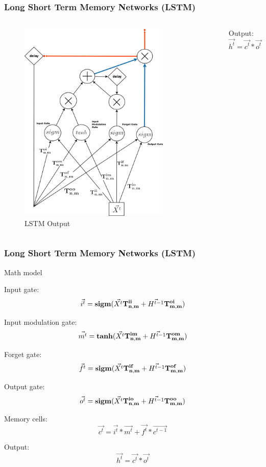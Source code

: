 \documentclass{beamer}
\begin{document}
\begin{frame}
\frametitle{Long Short Term Memory Networks (LSTM)}
\begin{columns}
\begin{figure}[t!]
    \centering
    \includegraphics[width=0.8\textwidth]{./pictures/figures/LSTM_output.png}
    \caption{LSTM Output}
    \label{fig:LSTM_output}
\end{figure}

Output:
$$\vec{h^t} = \vec{c^t} * \vec{o^t}$$
\end{columns}
\end{frame}

\begin{frame}
\frametitle{Long Short Term Memory Networks (LSTM)}
Math model \cite{zaremba2014recurrent}

Input gate:
$$\vec{i^t} = \bold{sigm}(\vec{X^t}\bold{T_{n,m}^{ii}} + \vec{H^{t-1}}\bold{T_{m,m}^{oi}})$$

Input modulation gate:
$$\vec{m^t} = \bold{tanh}(\vec{X^t}\bold{T_{n,m}^{im}} + \vec{H^{t-1}}\bold{T_{m,m}^{om}})$$

Forget gate:
$$\vec{f^t} = \bold{sigm}(\vec{X^t}\bold{T_{n,m}^{if}} + \vec{H^{t-1}}\bold{T_{m,m}^{of}})$$

Output gate:
$$\vec{o^t} = \bold{sigm}(\vec{X^t}\bold{T_{n,m}^{io}} + \vec{H^{t-1}}\bold{T_{m,m}^{oo}})$$

Memory cells:
$$\vec{c^t} = \vec{i^t} * \vec{m^t} + \vec{f^t} * \vec{c^{t-1}}$$

Output:
$$\vec{h^t} = \vec{c^t} * \vec{o^t}$$
\end{frame}
\end{document}
